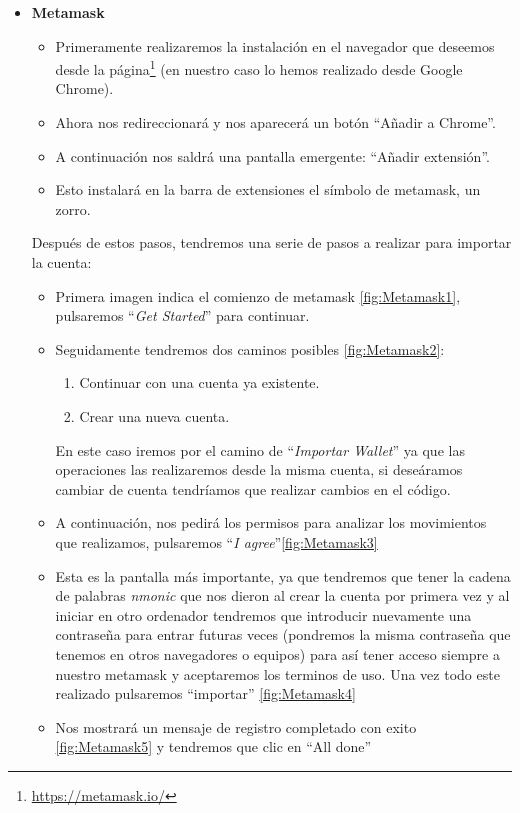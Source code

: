 \begin{itemize}
	\item \textbf{Metamask\label{ref:install}} 
	\begin{itemize}
		\item Primeramente realizaremos la instalación en el navegador que deseemos desde la página\footnote{\url{https://metamask.io/}} (en nuestro caso lo hemos realizado desde Google Chrome).
		\item Ahora nos redireccionará y nos aparecerá un botón ``Añadir a Chrome''. 
		\item A continuación nos saldrá una pantalla emergente: ``Añadir extensión''. 
		\item Esto instalará en la barra de extensiones el símbolo de metamask, un zorro. 
	\end{itemize}

Después de estos pasos, tendremos una serie de pasos a realizar para importar la cuenta:
	
	\begin{itemize}
		\item Primera imagen indica el comienzo de metamask \ref{fig:Metamask1}, pulsaremos ``\textit{Get Started}'' para continuar.
		\item Seguidamente tendremos dos caminos posibles \ref{fig:Metamask2}:
			\begin{enumerate}
				\item Continuar con una cuenta ya existente.
				\item Crear una nueva cuenta.
			\end{enumerate}
		En este caso iremos por el camino de ``\textit{Importar Wallet}'' ya que las operaciones las realizaremos desde la misma cuenta, si deseáramos cambiar de cuenta tendríamos que realizar cambios en el código.	
		\item A continuación, nos pedirá los permisos para analizar los movimientos que realizamos, pulsaremos ``\textit{I agree}''\ref{fig:Metamask3}
		\item Esta es la pantalla más importante, ya que tendremos que tener la cadena de palabras \textit{nmonic} que nos dieron al crear la cuenta por primera vez y al iniciar en otro ordenador tendremos que introducir nuevamente una contraseña para entrar futuras veces (pondremos la misma contraseña que tenemos en otros navegadores o equipos) para así tener acceso siempre a nuestro metamask y aceptaremos los terminos de uso. Una vez todo este realizado pulsaremos ``importar'' \ref{fig:Metamask4}
		\item Nos mostrará un mensaje de registro completado con exito \ref{fig:Metamask5} y tendremos que clic en ``All done''
	\end{itemize}
	

\end{itemize}
